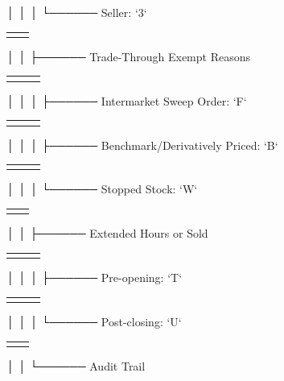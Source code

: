 \documentclass[11pt]{article}
\begin{document}
│       │   │   └────── Seller: `3`
\begin{center}
\begin{tabular}{ll}
 & \\[0pt]
\end{tabular}
\end{center}
│       │   ├────── Trade-Through Exempt Reasons
\begin{center}
\begin{tabular}{lll}
 &  & \\[0pt]
\end{tabular}
\end{center}
│       │   │   ├────── Intermarket Sweep Order: `F`
\begin{center}
\begin{tabular}{lll}
 &  & \\[0pt]
\end{tabular}
\end{center}
│       │   │   ├────── Benchmark/Derivatively Priced: `B`
\begin{center}
\begin{tabular}{lll}
 &  & \\[0pt]
\end{tabular}
\end{center}
│       │   │   └────── Stopped Stock: `W`
\begin{center}
\begin{tabular}{ll}
 & \\[0pt]
\end{tabular}
\end{center}
│       │   ├────── Extended Hours or Sold
\begin{center}
\begin{tabular}{lll}
 &  & \\[0pt]
\end{tabular}
\end{center}
│       │   │   ├────── Pre-opening: `T`
\begin{center}
\begin{tabular}{lll}
 &  & \\[0pt]
\end{tabular}
\end{center}
│       │   │   └────── Post-closing: `U`
\begin{center}
\begin{tabular}{ll}
 & \\[0pt]
\end{tabular}
\end{center}
│       │   └────── Audit Trail
\end{document}
